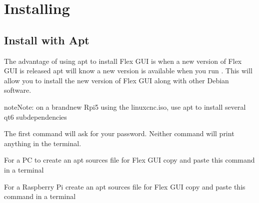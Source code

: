 \documentclass[letterpaper,10pt,english]{sphinxmanual}
\begin{document}
\sphinxstepscope


\chapter{Installing}
\label{\detokenize{install:installing}}\label{\detokenize{install::doc}}

\section{Install with Apt}
\label{\detokenize{install:install-with-apt}}\label{\detokenize{install:install-apt}}
\sphinxAtStartPar
The advantage of using apt to install Flex GUI is when a new version of Flex GUI
is released apt will know a new version is available when you run
. This will allow you to install the new version of Flex GUI
along with other Debian software.

\begin{sphinxadmonition}{note}{Note:}
\sphinxAtStartPar
on a brand\sphinxhyphen{}new Rpi5 using the linuxcnc.iso, use apt  to install several qt6 sub\sphinxhyphen{}dependencies
\end{sphinxadmonition}

\sphinxAtStartPar
The first command will ask for your password. Neither command will print
anything in the terminal.

\sphinxAtStartPar
For a PC to create an apt sources file for Flex GUI copy and paste this command
in a terminal

\begin{sphinxVerbatim}[commandchars=\\\{\}]
     
\end{sphinxVerbatim}

\sphinxAtStartPar
For a Raspberry Pi create an apt sources file for Flex GUI copy and paste this
command in a terminal

\begin{sphinxVerbatim}[commandchars=\\\{\}]
     
\end{sphinxVerbatim}
\end{document}
